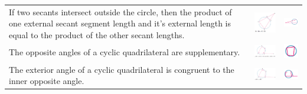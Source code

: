 \documentclass[a4paper,10pt]{report}
\begin{document}
\begin{center}
\begin{tabular}[center]{p{5cm}|p{3cm}|p{2cm}}
		If two secants intersect outside the circle, then the product of one external secant segment length and it's external length is equal to the product of the other secant lengths.                                            & \includegraphics[width=3cm]{circle theorem 13} & \includegraphics[width=2cm]{circle theorem 13 symbol} \\
		The opposite angles of a cyclic quadrilateral are supplementary.                                                                                                                                                             & \includegraphics[width=3cm]{circle theorem 14} & \includegraphics[width=2cm]{circle theorem 14 symbol} \\
		The exterior angle of a cyclic quadrilateral is congruent to the inner opposite angle.                                                                                                                                       & \includegraphics[width=3cm]{circle theorem 15} & \includegraphics[width=2cm]{circle theorem 15 symbol}
	\end{tabular}
\end{center}
\end{document}
